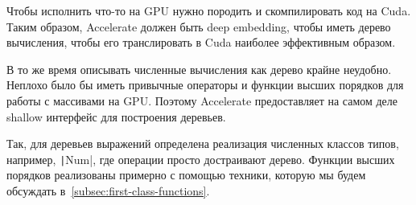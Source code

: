 Чтобы исполнить что-то на GPU нужно породить и скомпилировать код на Cuda.
Таким образом, Accelerate должен быть deep embedding, чтобы иметь дерево вычисления, чтобы его транслировать в Cuda наиболее эффективным образом.

В то же время описывать численные вычисления как дерево крайне неудобно.
Неплохо было бы иметь привычные операторы и функции высших порядков для работы с массивами на GPU\@.
Поэтому Accelerate предоставляет на самом деле shallow интерфейс для построения деревьев.

Так, для деревьев выражений определена реализация численных классов типов, например, \texttt|Num|, где операции просто достраивают дерево.
Функции высших порядков реализованы примерно с помощью техники, которую мы будем обсуждать в~\ref{subsec:first-class-functions}. %


